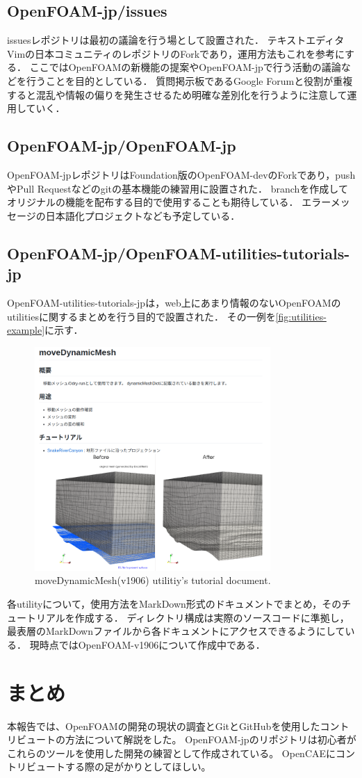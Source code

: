\documentclass{ltjoc}
\begin{document}
\subsection{OpenFOAM-jp/issues}
issuesレポジトリ\cite{URL:OpenFOAM-jp-issues}は最初の議論を行う場として設置された．
テキストエディタVimの日本コミュニティのレポジトリ\cite{URL:vim-jp}のForkであり，運用方法もこれを参考にする．
ここではOpenFOAMの新機能の提案やOpenFOAM-jpで行う活動の議論などを行うことを目的としている．
質問掲示板であるGoogle Forumと役割が重複すると混乱や情報の偏りを発生させるため明確な差別化を行うように注意して運用していく．
%
\subsection{OpenFOAM-jp/OpenFOAM-jp}
OpenFOAM-jpレポジトリ\cite{URL:OpenFOAM-jp-OpenFOAM-jp}はFoundation版のOpenFOAM-devのForkであり，pushやPull Requestなどのgitの基本機能の練習用に設置された．
branchを作成してオリジナルの機能を配布する目的で使用することも期待している．
エラーメッセージの日本語化プロジェクトなども予定している．
%
\subsection{OpenFOAM-jp/OpenFOAM-utilities-tutorials-jp}
OpenFOAM-utilities-tutorials-jp\cite{URL:OpenFOAM-jp-OpenFOAM-utilities-tutorials-jp}は，web上にあまり情報のないOpenFOAMのutilitiesに関するまとめを行う目的で設置された．
その一例を\autoref{fig:utilities-example}に示す．
\begin{figure}[htbp]
\centering
\includegraphics[width=0.8\textwidth]{fig/utilities-example.png}
\caption{moveDynamicMesh(v1906) utilitiy's tutorial document.\cite{URL:OpenFOAM-jp-movedDynamicMesh}}
\label{fig:utilities-example}
\end{figure}
各utilityについて，使用方法をMarkDown形式のドキュメントでまとめ，そのチュートリアルを作成する．
ディレクトリ構成は実際のソースコードに準拠し，最表層のMarkDownファイルから各ドキュメントにアクセスできるようにしている．\cite{URL:OpenFOAM-jp-util-index}
現時点ではOpenFOAM-v1906について作成中である．
%
\section{まとめ}
本報告では、OpenFOAMの開発の現状の調査とGitとGitHubを使用したコントリビュートの方法について解説をした。
OpenFOAM-jpのリポジトリは初心者がこれらのツールを使用した開発の練習として作成されている。
OpenCAEにコントリビュートする際の足がかりとしてほしい。


\end{document}
